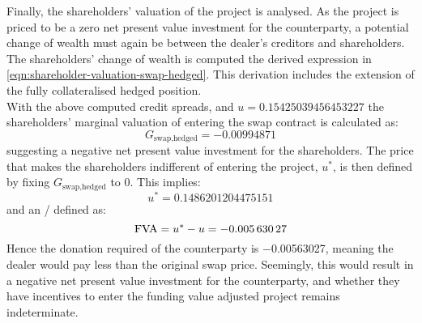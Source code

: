 \documentclass[main.tex]{subfiles}
\begin{document}
        Finally, the shareholders' valuation of the project is analysed.
        As the project is priced to be a zero net present value investment for the counterparty,
        a potential change of wealth must again be between the dealer's creditors and shareholders.
        The shareholders' change of wealth is computed the derived expression in \cref{eqn:shareholder-valuation-swap-hedged}.
        This derivation includes the extension of the fully collateralised hedged position.
        \\
        With the above computed credit spreads, and $u=\num{0.15425039456453227}$
        the shareholders' marginal valuation of entering the swap contract is calculated as:
        \begin{equation}
            G_{\text{swap,hedged}} = \num{-0.00994871}
        \end{equation}
        suggesting a negative net present value investment for the shareholders. 
        The price that makes the shareholders indifferent of entering the project, $u^{\ast}$, is then defined by fixing $G_{\text{swap,hedged}}$ to 0.
        This implies:
        \begin{equation}
            u^{\ast} = \num{0.1486201204475151}
        \end{equation}
        and an \FVA/ defined as:
        \begin{equation}
            \FVA/ = u^{\ast} - u = \num{-0.00563027}
        \end{equation}
        Hence the donation required of the counterparty is \num{-0.00563027},
        meaning the dealer would pay less than the original swap price.
        Seemingly, this would result in a negative net present value investment for the counterparty,
        and whether they have incentives to enter the funding value adjusted project remains indeterminate.
\end{document}
